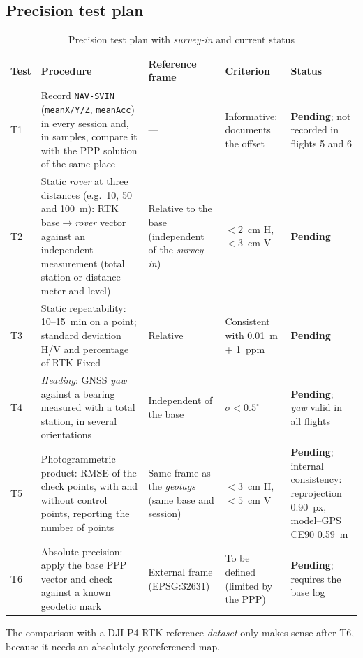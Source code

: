 \subsection{Precision test plan}
\label{subsec:pla-precisio}

\begin{table}[H]
    \centering
    \caption{Precision test plan with \emph{survey-in} and current status}
    \label{tab:validacio}
    \footnotesize
    \begin{tabular}{P{0.8cm}P{4.9cm}P{2.8cm}P{2.6cm}P{2.4cm}}
        \toprule
        Test & Procedure & Reference frame & Criterion & Status \\
        \midrule
        T1 & Record \texttt{NAV-SVIN} (\texttt{meanX/Y/Z}, \texttt{meanAcc}) in every session and, in samples, compare it with the PPP solution of the same place & --- & Informative: documents the offset & \textbf{Pending}; not recorded in flights 5 and 6 \\
        T2 & Static \emph{rover} at three distances (e.g.\ 10, 50 and 100~m): RTK base$\rightarrow$\emph{rover} vector against an independent measurement (total station or distance meter and level) & Relative to the base (independent of the \emph{survey-in}) & $< 2$~cm H, $< 3$~cm V & \textbf{Pending} \\
        T3 & Static repeatability: 10--15~min on a point; standard deviation H/V and percentage of RTK Fixed & Relative & Consistent with 0.01~m + 1~ppm & \textbf{Pending} \\
        T4 & \emph{Heading}: GNSS \emph{yaw} against a bearing measured with a total station, in several orientations & Independent of the base & $\sigma < 0.5^{\circ}$ & \textbf{Pending}; \emph{yaw} valid in all flights \\
        T5 & Photogrammetric product: RMSE of the check points, with and without control points, reporting the number of points & Same frame as the \emph{geotags} (same base and session) & $< 3$~cm H, $< 5$~cm V & \textbf{Pending}; internal consistency: reprojection 0.90~px, model--GPS CE90 0.59~m \\
        T6 & Absolute precision: apply the base PPP vector and check against a known geodetic mark & External frame (EPSG:32631) & To be defined (limited by the PPP) & \textbf{Pending}; requires the base log \\
        \bottomrule
    \end{tabular}
\end{table}

The comparison with a DJI P4 RTK reference \emph{dataset} only makes sense after T6, because it needs an absolutely georeferenced map.

